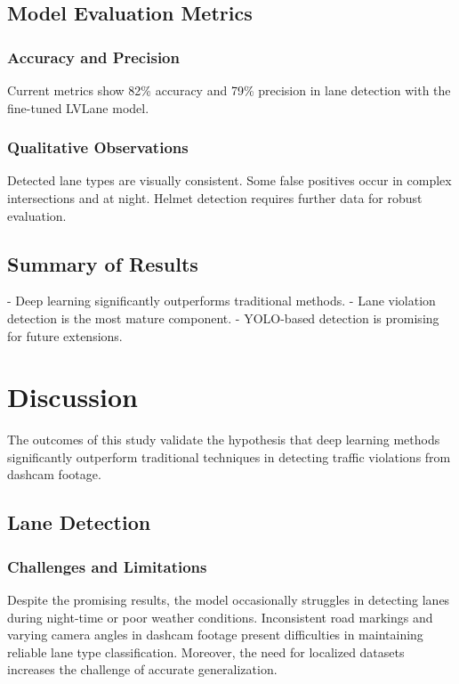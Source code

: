 \documentclass[12pt,a4paper]{article}
\begin{document}
\subsection{Model Evaluation Metrics}

\subsubsection{Accuracy and Precision}
Current metrics show 82\% accuracy and 79\% precision in lane detection with the fine-tuned LVLane model.

\subsubsection{Qualitative Observations}
Detected lane types are visually consistent. Some false positives occur in complex intersections and at night. Helmet detection requires further data for robust evaluation.

\subsection{Summary of Results}
- Deep learning significantly outperforms traditional methods.
- Lane violation detection is the most mature component.
- YOLO-based detection is promising for future extensions.

\section{Discussion}
The outcomes of this study validate the hypothesis that deep learning methods significantly outperform traditional techniques in detecting traffic violations from dashcam footage. 

\subsection{Lane Detection}
\subsubsection{Challenges and Limitations}
Despite the promising results, the model occasionally struggles in detecting lanes during night-time or poor weather conditions. Inconsistent road markings and varying camera angles in dashcam footage present difficulties in maintaining reliable lane type classification. Moreover, the need for localized datasets increases the challenge of accurate generalization.
\end{document}
